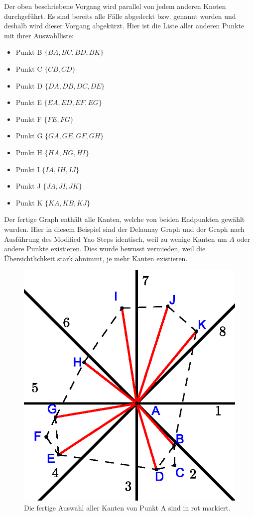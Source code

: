 \documentclass[a4paper,twoside]{IEEEtran}
\begin{document}
Der oben beschriebene Vorgang wird parallel von jedem anderen Knoten durchgeführt.
Es sind bereits alle Fälle abgedeckt bzw. genannt worden und deshalb wird dieser Vorgang abgekürzt.
Hier ist die Liste aller anderen Punkte mit ihrer Auswahlliste:
\begin{itemize}
\item Punkt B $\{BA, BC, BD, BK\}$
\item Punkt C $\{CB, CD\}$
\item Punkt D $\{DA, DB, DC, DE\}$
\item Punkt E $\{EA, ED, EF, EG\}$
\item Punkt F $\{FE, FG\}$
\item Punkt G $\{GA, GE, GF, GH\}$
\item Punkt H $\{HA, HG, HI\}$
\item Punkt I $\{IA, IH, IJ\}$
\item Punkt J $\{JA, JI, JK\}$
\item Punkt K $\{KA, KB, KJ\}$
\end{itemize}

Der fertige Graph enthält alle Kanten, welche von beiden Endpunkten gewählt wurden.
Hier in diesem Beispiel sind der Delaunay Graph und der Graph nach Ausführung des Modified Yao Steps identisch, weil zu wenige Kanten um $A $ oder andere Punkte existieren.
Dies wurde bewusst vermieden, weil die Übersichtlichkeit stark abnimmt, je mehr Kanten existieren.

\begin{figure}[h!]
\centering
\includegraphics[width=0.6\linewidth]{finished_A.eps}
\caption{Die fertige Auswahl aller Kanten von Punkt A sind in rot markiert.}
\label{fig:finished_a}
\end{figure}
\end{document}
